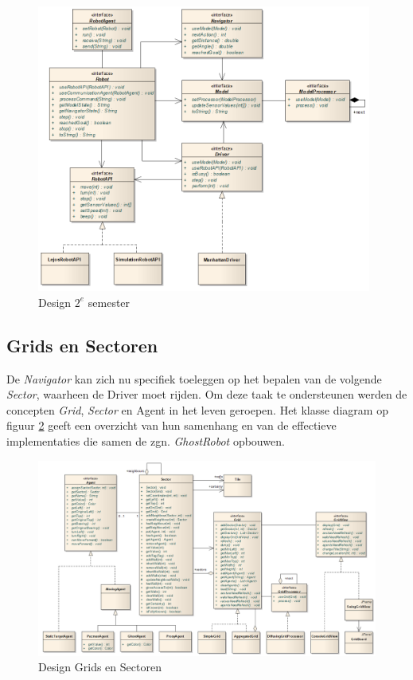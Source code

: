 \documentclass[12pt,a4paper]{report}
\begin{document}
\begin{figure}[htbp]
  \centering
  \includegraphics[width=110mm]{resources/design-semester2.png}
  \caption{Design $2^e$ semester}
  \label{uml:design-semster2}
\end{figure}

\subsection{Grids en Sectoren}

De \emph{Navigator} kan zich nu specifiek toeleggen op het bepalen van de volgende \emph{Sector}, waarheen de Driver moet rijden. Om deze taak te ondersteunen werden de concepten \emph{Grid}, \emph{Sector} en Agent in het leven geroepen. Het klasse diagram op figuur \ref{uml:grids-sectoren} geeft een overzicht van hun samenhang en van de effectieve implementaties die samen de zgn. \emph{GhostRobot} opbouwen.

\begin{figure}[htbp]
  \centering
  \includegraphics[width=200mm, angle=90]{resources/grids-sectors.png}
  \caption{Design Grids en Sectoren}
  \label{uml:grids-sectoren}
\end{figure}
\end{document}
